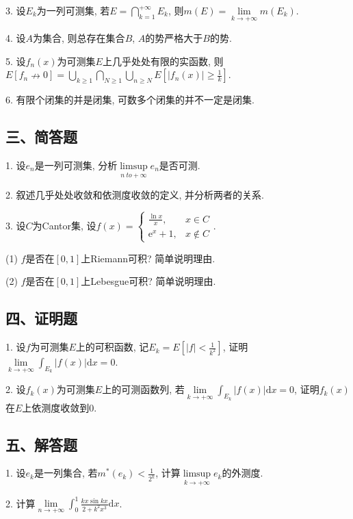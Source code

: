 \documentclass[UTF8]{article}
\begin{document}
  3. 设$E_k$为一列可测集, 若$E=\bigcap_{k=1}^{+\infty}E_k$, 则$m(E)=\lim \limits_{k \to +\infty}m(E_k)$.\par

  4. 设$A$为集合, 则总存在集合$B$, $A$的势严格大于$B$的势.\par

  5. 设$f_n(x)$为可测集$E$上几乎处处有限的实函数, 则$E\left[f_n\nrightarrow 0\right]=\bigcup_{k\geqslant 1} \bigcap_{N\geqslant 1}\bigcup_{n\geqslant N} E\left[|f_n(x)|\geqslant \frac{1}{k}\right]$.\par

  6. 有限个闭集的并是闭集, 可数多个闭集的并不一定是闭集.\par

  \subsection*{三、简答题}

  1. 设$e_n$是一列可测集, 分析$\limsup \limits_{n \ to +\infty}e_n$是否可测.\par

  2. 叙述几乎处处收敛和依测度收敛的定义, 并分析两者的关系.\par

  3. 设$C$为Cantor集, 设$f(x)=\begin{cases}
    \frac{\ln x}{x}, & x\in C \\
    \mathrm{e}^x+1, & x\notin C
  \end{cases}$.\par
  (1) $f$是否在$[0,1]$上Riemann可积? 简单说明理由.\par
  (2) $f$是否在$[0,1]$上Lebesgue可积? 简单说明理由.\par

  \subsection*{四、证明题}

  1. 设$f$为可测集$E$上的可积函数, 记$E_k=E\left[|f|<\frac{1}{k^2}\right]$, 证明$\lim \limits_{k \to +\infty}\int_{E_k}|f(x)|\mathrm{d}x=0$.\par

  2. 设$f_k(x)$为可测集$E$上的可测函数列, 若$\lim \limits_{k \to +\infty}\int_{E_k}|f(x)|\mathrm{d}x=0$, 证明$f_k(x)$在$E$上依测度收敛到0.\par

  \subsection*{五、解答题}

  1. 设$e_k$是一列集合, 若$m^{*}(e_k)<\frac{1}{2^k}$, 计算$\limsup \limits_{k \to +\infty}e_k$的外测度.\par

  2. 计算$\lim \limits_{n \to +\infty}\int_{0}^{1}\frac{kx \sin{kx}}{2+k^2x^3}\mathrm{d}x$.\par
\end{document}
